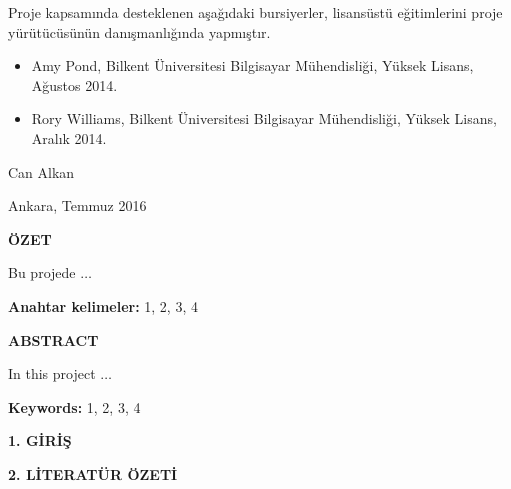 \documentclass[11pt]{article}
\begin{document}
Proje kapsamında desteklenen aşağıdaki bursiyerler,  lisansüstü eğitimlerini 
proje yürütücüsünün danışmanlığında
yapmıştır.
 
\begin{itemize}
\item Amy Pond, Bilkent Üniversitesi Bilgisayar Mühendisliği, Yüksek Lisans, Ağustos 2014.
\item Rory Williams, Bilkent Üniversitesi Bilgisayar Mühendisliği, Yüksek Lisans, Aralık 2014.
\end{itemize}


\bigskip
\hfill Can Alkan

\hfill Ankara, Temmuz 2016
\newpage

\setlength{\parskip}{1mm} 

\tableofcontents
\listoffigures
\listoftables



\newpage \setlength{\parskip}{3mm}
\phantom{ss}
\vspace{-2.5cm}

\begin{center}
{\bf \Large ÖZET} 
\end{center}
\noindent

Bu projede $\ldots$

{\bf Anahtar kelimeler:} 1, 2, 3, 4

\newpage
\phantom{ss}
\vspace{-2.5cm}


\begin{center}
{\bf \Large ABSTRACT}
\end{center}
\noindent

In this project $\ldots$

{\bf Keywords:} 1, 2, 3, 4

\newpage
{}
\setcounter{page}{1}

\begin{center}
{\bf \Large 1. GİRİŞ}
\end{center}

\bigskip
\noindent

\lipsum[1-2]


\noindent

\clearpage
\begin{center}
{\bf \Large 2. LİTERATÜR ÖZETİ}
\end{center}
\end{document}
